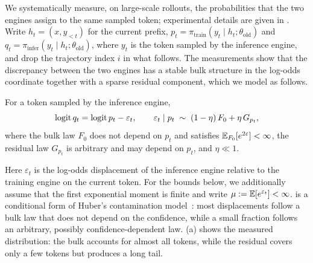 We systematically measure, on large-scale rollouts, the probabilities that the
two engines assign to the same sampled token; experimental details are given in
. Write $h_t=(x,y_{<t})$ for the current prefix,
$p_t=\pi_{\mathrm{train}}(y_t\mid h_t;\theta_{\mathrm{old}})$ and
$q_t=\pi_{\mathrm{infer}}(y_t\mid h_t;\theta_{\mathrm{old}})$, where $y_t$ is
the token sampled by the inference engine, and drop the trajectory index $i$ in
what follows. The measurements show that the discrepancy between the two engines
has a stable bulk structure in the log-odds coordinate together with a sparse
residual component, which we model as follows.

\begin{definition}
\label{def:logit_displacement}
For a token sampled by the inference engine,
\begin{equation}
\operatorname{logit} q_t=\operatorname{logit} p_t-\varepsilon_t,
\qquad
\varepsilon_t\mid p_t\;\sim\;(1-\eta)\,F_0+\eta\,G_{p_t},
\label{eq:logit_displacement}
\end{equation}
where the bulk law $F_0$ does not depend on $p_t$ and satisfies
$\mathbb{E}_{F_0}[e^{2\varepsilon}]<\infty$, the residual law $G_{p_t}$ is arbitrary
and may depend on $p_t$, and $\eta\ll1$.
\end{definition}

Here $\varepsilon_t$ is the log-odds displacement of the inference engine
relative to the training engine on the current token. For the bounds below, we
additionally assume that the first exponential moment is finite and write
$\mu:=\mathbb{E}[e^{\varepsilon_t}]<\infty$.  is a
conditional form of Huber's contamination model~\citep{huber1964robust}: most
displacements follow a bulk law that does not depend on the confidence, while a
small fraction follows an arbitrary, possibly confidence-dependent law.
(a) shows the measured distribution: the bulk accounts for
almost all tokens, while the residual covers only a few tokens but produces a
long tail.

